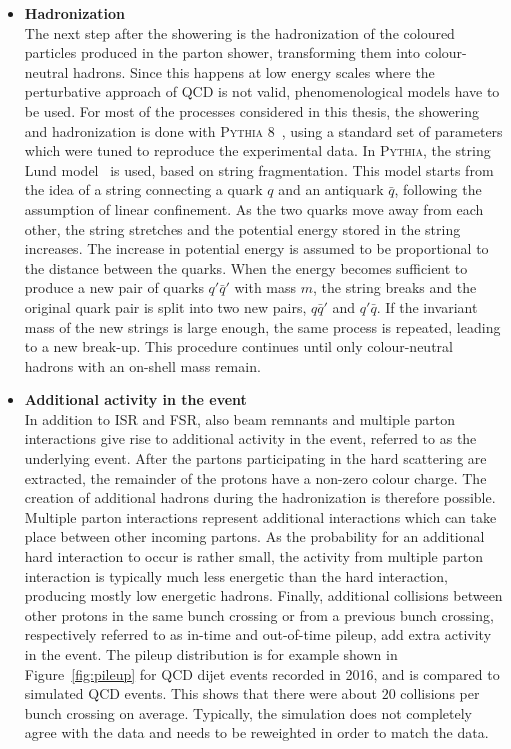 \begin{itemize}
\item[] \textbf{Hadronization}\\
The next step after the showering is the hadronization of the coloured particles produced in the parton shower, transforming them into colour-neutral hadrons. Since this happens at low energy scales where the perturbative approach of \acs{QCD} is not valid, phenomenological models have to be used. For most of the processes considered in this thesis, the showering and hadronization is done with \textsc{Pythia 8}~\cite{Sjostrand:2006za}, using a standard set of parameters which were tuned to reproduce the experimental data. In \textsc{Pythia}, the string Lund model~\cite{Andersson:1983ia} is used, based on string fragmentation. This model starts from the idea of a string connecting a quark $q$ and an antiquark $\bar{q}$, following the assumption of linear confinement. As the two quarks move away from each other, the string stretches and the potential energy stored in the string increases. The increase in potential energy is assumed to be proportional to the distance between the quarks. When the energy becomes sufficient to produce a new pair of quarks $q'\bar{q}'$ with mass $m$, the string breaks and the original quark pair is split into two new pairs, $q\bar{q}'$ and $q'\bar{q}$. If the invariant mass of the new strings is large enough, the same process is repeated, leading to a new break-up. This procedure continues until only colour-neutral hadrons with an on-shell mass remain.

\item[] \textbf{Additional activity in the event}\\
In addition to \ac{ISR} and \ac{FSR}, also beam remnants and multiple parton interactions give rise to additional activity in the event, referred to as the underlying event. After the partons participating in the hard scattering are extracted, the remainder of the protons have a non-zero colour charge. The creation of additional hadrons during the hadronization is therefore possible. Multiple parton interactions represent additional interactions which can take place between other incoming partons. As the probability for an additional hard interaction to occur is rather small, the activity from multiple parton interaction is typically much less energetic than the hard interaction, producing mostly low energetic hadrons. Finally, additional collisions between other protons in the same bunch crossing or from a previous bunch crossing, respectively referred to as in-time and out-of-time pileup, add extra activity in the event. The pileup distribution is for example shown in Figure~\ref{fig:pileup} for QCD dijet events recorded in 2016, and is compared to simulated QCD events. This shows that there were about $20$ collisions per bunch crossing on average. Typically, the simulation does not completely agree with the data and needs to be reweighted in order to match the data.


\end{itemize}
